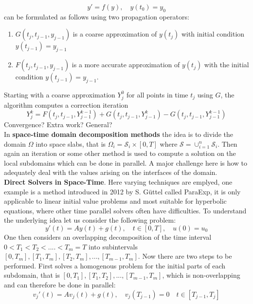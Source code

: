 \documentclass[../draft_1.tex]{subfiles}
\begin{document}
\begin{equation*}
y' = f(y), \quad y(t_0) = y_0
\end{equation*}
can be formulated as follows using two propagation operators:
\begin{enumerate}
	\item $G(t_j, t_{j-1}, y_{j-1})$ is a coarse approximation of $y(t_j)$ with initial condition $y(t_{j-1}) = y_{j-1} $
	\item $F(t_j, t_{j-1}, y_{j-1})$ is a more accurate approximation of $y(t_j)$ with the initial condition $y(t_{j-1}) = y_{j-1}$.
\end{enumerate}
Starting with a coarse approximation $Y_j^0$ for all points in time $t_j$ using $G$, the algorithm computes a correction iteration 
\begin{equation*}
Y_{j}^{k} = F(t_j, t_{j-1}, Y_{j-1}^{k-1}) + G(t_j, t_{j-1}, Y_{j-1}^{k}) - G(t_j, t_{j-1}, Y_{j-1}^{k-1})
\end{equation*}
Convergence? Extra work? General?
\smallskip
\\
In \textbf{space-time domain decomposition methods} the idea is to divide the domain $\Omega$ into space slabs, that is $\Omega_i = \mathcal{S}_i \times [0,T]$ where $\mathcal{S} = \cup_{i=1}^n \mathcal{S}_i$. Then again an iteration or some other method is used to compute a solution on the local subdomains which can be done in parallel. A major challenge here is how to adequately deal with the values arising on the interfaces of the domain. 
\smallskip
\\
\textbf{Direct Solvers in Space-Time}. Here varying techniques are emplyed, one example is a method introduced in 2012 by S. G\"uttel called ParaExp, it is only applicable to linear initial value problems and most suitable for hyperbolic equations, where other time parallel solvers often have difficulties. To understand the underlying idea let us consider the following problem:
\begin{equation}
y'(t) = Ay(t) + g(t), \quad t \in [0,T], \quad u(0) = u_0
\end{equation}
One then considers an overlapping decomposition of the time interval $0 < T_1 < T_2 < .... < T_m = T$ into subintervals $[0, T_m], [T_1, T_m], [T_2, T_m], ..., [T_{m-1}, T_m]$. Now there are two steps to be performed. First solves a homogenous problem for the initial parts of each subdomain, that is $[0,T_1], [T_1, T_2], ... , [T_{m-1}, T_m]$, which is non-overlapping and can therefore be done in parallel:
\begin{equation}
v_j'(t) = A v_j(t) + g(t), \quad v_j(T_{j-1}) = 0 \quad t \in [T_{j-1}, T_j]
\end{equation}
\end{document}
